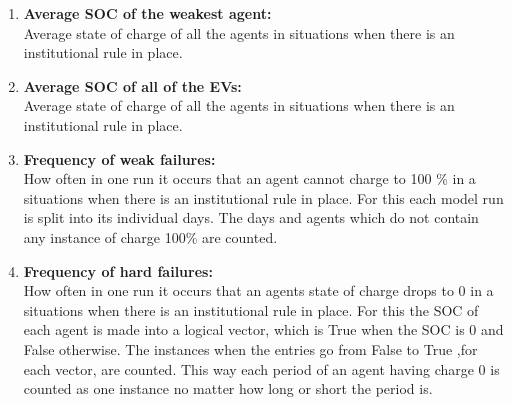 \documentclass[a4paper]{article}
\begin{document}
\begin{enumerate}
 \item \textbf{Average SOC of the weakest agent:}\\
 Average state of charge of all the agents in situations when there is an institutional rule in place.
 \item \textbf{Average SOC of all of the EVs:}\\
 Average state of charge of all the agents in situations when there is an institutional rule in place.
 \item \textbf{Frequency of weak failures:}\\
 How often in one run it occurs that 
 an agent cannot charge to 100 \% in a situations when there is an institutional rule in place. For this each model run 
 is split into its individual days. The days and agents which do not contain any instance of charge 100\% are counted.
 \item \textbf{Frequency of hard failures:}\\
 How often in one run it occurs that 
 an agents state of charge drops to 0 in a situations when there is an institutional rule in place. For this the SOC of each 
 agent is made into a logical vector, which is True when the SOC is 0 and False otherwise. The instances when the entries go from False
 to True ,for each vector, are counted. This way each period of an agent having charge 0 is counted as one instance no matter how long or 
 short the period is.
\end{enumerate}

\end{document}
